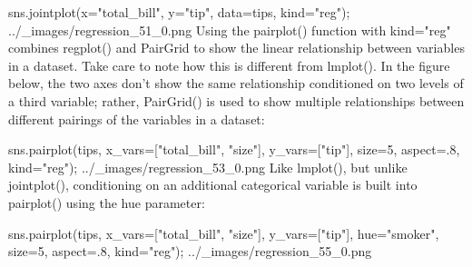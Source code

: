 sns.jointplot(x="total_bill", y="tip", data=tips, kind="reg");
../_images/regression_51_0.png
Using the pairplot() function with kind="reg" combines regplot() and PairGrid to show the linear relationship between variables in a dataset. Take care to note how this is different from lmplot(). In the figure below, the two axes don’t show the same relationship conditioned on two levels of a third variable; rather, PairGrid() is used to show multiple relationships between different pairings of the variables in a dataset:

sns.pairplot(tips, x_vars=["total_bill", "size"], y_vars=["tip"],
             size=5, aspect=.8, kind="reg");
../_images/regression_53_0.png
Like lmplot(), but unlike jointplot(), conditioning on an additional categorical variable is built into pairplot() using the hue parameter:

sns.pairplot(tips, x_vars=["total_bill", "size"], y_vars=["tip"],
             hue="smoker", size=5, aspect=.8, kind="reg");
../_images/regression_55_0.png
